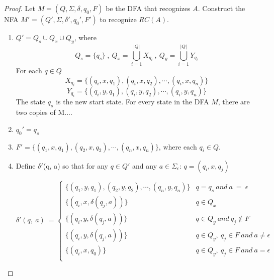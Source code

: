\documentclass[11pt]{article}
\begin{document}
\begin{proof}
Let $M = (Q, \Sigma, \delta, q_{0}, F)$ be the DFA that recognizes $A$. Construct the NFA $M' = (Q', \Sigma, \delta', q_{0}', F')$ to recognize $RC(A)$.
\begin{enumerate}
\item $Q' = Q_{s} \cup Q_{x} \cup Q_{y}$, where
\[ 
Q_{s} = \{ q_{s} \} \ , \ Q_{x} = \bigcup_{i=1}^{|Q|}X_{q_{i}} \ , \ Q_{y} = \bigcup_{i=1}^{|Q|}Y_{q_{i}}
\]
For each $q \in Q$
\[
X_{q_{i}} = \{(q_{i}, x, q_{1}), (q_{i}, x, q_{2}), \cdots , (q_{i}, x, q_{n})\}
\]
\[
Y_{q_{i}} = \{(q_{i}, y, q_{1}), (q_{i}, y, q_{2}), \cdots , (q_{i}, y, q_{n})\}
\]
The state $q_{s}$ is the new start state. For every state in the DFA $M$, there are two copies of M....
\item $q_{0}' = q_{s}$
\item $F' = \{ (q_{1}, x, q_{1}), (q_{2}, x, q_{2}), \cdots, (q_{n}, x, q_{n})  \}$, where each $q_{i} \in Q$.
\item Define $\delta'$(q, a) so that for any $q \in Q'$ and any $a \in \Sigma_{\epsilon}$: $q = (q_{i},x,q_{j})$
\begin{center}
$\displaystyle \delta '( q,\ a) \ =\begin{cases}
\{(q_{1}, y, q_{1}), (q_{2}, y, q_{2}),\cdots,(q_{n}, y, q_{n})\} & q=q_{s} \ and\ a\ =\ \epsilon \\
\{(q_{i},x,\delta(q_{j},a))\}  & q \in Q_{x} \\
\{(q_{i},y,\delta(q_{j},a))\}  & q \in Q_{y} \ and \ q_{j} \notin F \\
\{(q_{i},y,\delta(q_{j},a))\}  & q \in Q_{y}, \ q_{j} \in F \ and \ a \neq \epsilon \\
\{(q_{i},x,q_{0})\}  & q \in Q_{y}, \ q_{j} \in F \ and \ a = \epsilon \\
\end{cases} \ \ $
\end{center}
\end{enumerate}
\end{proof}
\end{document}
